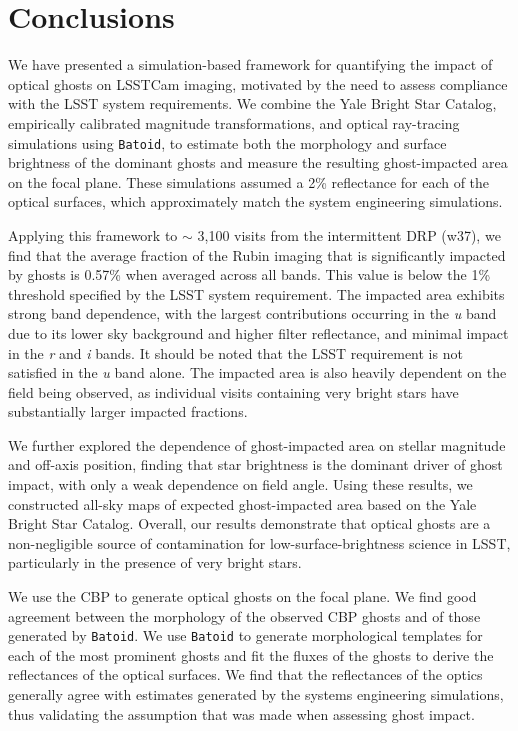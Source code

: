 \section{Conclusions}
\label{sec:conclusions}
We have presented a simulation-based framework for quantifying the impact of optical ghosts on LSSTCam imaging, motivated by the need to assess compliance with the LSST system requirements. We combine the Yale Bright Star Catalog, empirically calibrated magnitude transformations, and optical ray-tracing simulations using \texttt{Batoid}, to estimate both the morphology and surface brightness of the dominant ghosts and measure the resulting ghost-impacted area on the focal plane. These simulations assumed a 2\% reflectance for each of the optical surfaces, which approximately match  the system engineering simulations.

Applying this framework to $\sim$ 3,100 visits from the intermittent DRP (w37), we find that the average fraction of the Rubin imaging that is significantly impacted by ghosts is 0.57\% when averaged across all bands. This value is below the 1\% threshold specified by the LSST system requirement. The impacted area exhibits strong band dependence, with the largest contributions occurring in the {\it u} band due to its lower sky background and higher filter reflectance, and minimal impact in the {\it r} and {\it i} bands. It should be noted that the LSST requirement is not satisfied in the {\it u} band alone.  The impacted area is also heavily dependent on the field being observed, as individual visits containing very bright stars have substantially larger impacted fractions.

We further explored the dependence of ghost-impacted area on stellar magnitude and off-axis position, finding that star brightness is the dominant driver of ghost impact, with only a weak dependence on field angle. Using these results, we constructed all-sky maps of expected ghost-impacted area based on the Yale Bright Star Catalog. Overall, our results demonstrate that optical ghosts are a non-negligible source of contamination for low-surface-brightness science in LSST, particularly in the presence of very bright stars. 

We use the CBP to generate optical ghosts on the focal plane. 
We find good agreement between the morphology of the observed CBP ghosts and of those generated by \texttt{Batoid}.
We use \texttt{Batoid} to generate morphological templates for each of the most prominent ghosts and fit the fluxes of the ghosts to derive the reflectances of the optical surfaces.
We find that the reflectances of the optics generally agree with estimates generated by the systems engineering simulations, thus validating the assumption that was made when assessing ghost impact.
